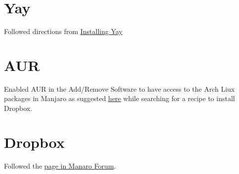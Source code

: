 \documentclass[]{scrartcl}
\begin{document}
\section{Yay}
\label{sec:yay}

Followed directions from \href{https://www.tecmint.com/install-yay-aur-helper-in-arch-linux-and-manjaro/}{Installing Yay}

\section{AUR}

Enabled AUR in the Add/Remove Software to have access to the Arch Liux packages in Manjaro as suggested \href{https://forum.manjaro.org/t/dropbox-install-new-to-manjaro/9576/5}{here} while searching for a recipe to install Dropbox.

\section{Dropbox}

Followed the \href{https://forum.manjaro.org/t/dropbox-install-new-to-manjaro/9576/5}{page in Manaro Forum}.
\end{document}
